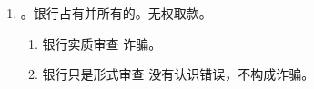 \begin{enumerate}
\begin{enumerate}
                \begin{enumerate}
                  \item {}。
                  \item {}。
                  \item {}。
                \end{enumerate}
          \item 取走赃款。。
          \item 帮取赃款。。
        \end{enumerate}
  \item {}。银行占有并所有的。无权取款。
        \begin{enumerate}
          \item 银行实质审查 \yjt 诈骗。
          \item 银行只是形式审查 \yjt 没有认识错误，不构成诈骗。
        \end{enumerate}
\end{enumerate}
